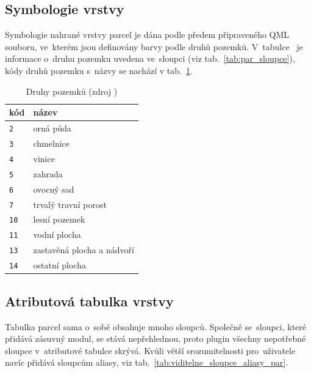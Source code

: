 \subsection{Symbologie vrstvy \texttt{}}
\label{symbologie_par}

Symbologie nahrané vrstvy parcel je dána podle předem připraveného QML
souboru, ve~kterém jsou definovány barvy podle druhů
pozemků. V~tabulce~\texttt{} je informace o~druhu pozemku
uvedena ve~sloupci \texttt{} (viz
tab.~\ref{tab:par_sloupce}), kódy druhů pozemku s~názvy se nachází v
tab.~\ref{tab:druhy_pozemku}.

\begin{table}[H]
    \begin{tabular}{|l|l|} \hline kód & název \\ \hline \hline
\texttt{2} & orná půda \\ \hline \texttt{3} & chmelnice \\ \hline
\texttt{4} & vinice \\ \hline \texttt{5} & zahrada \\ \hline
\texttt{6} & ovocný sad \\ \hline \texttt{7} & trvalý travní porost \\
\hline \texttt{10} & lesní pozemek \\ \hline \texttt{11} & vodní
plocha \\ \hline \texttt{13} & zastavěná plocha a nádvoří \\ \hline
\texttt{14} & ostatní plocha \\ \hline
    \end{tabular} \centering
    \caption[Druhy pozemků]{Druhy pozemků (zdroj
\citep{vyhlaska_357})}
    \label{tab:druhy_pozemku}
\end{table}

\newpage

\subsection{Atributová tabulka vrstvy \texttt{}}
\label{tabulka_par}

Tabulka parcel sama o~sobě obsahuje mnoho sloupců. Společně
se~sloupci, které přidává zásuvný modul, se stává nepřehlednou, proto
plugin všechny nepotřebné sloupce v~atributové tabulce skrývá. Kvůli
větší srozumitelnosti pro~uživatele navíc přidává sloupcům aliasy, viz
tab.~\ref{tab:viditelne_sloupce_aliasy_par}.

